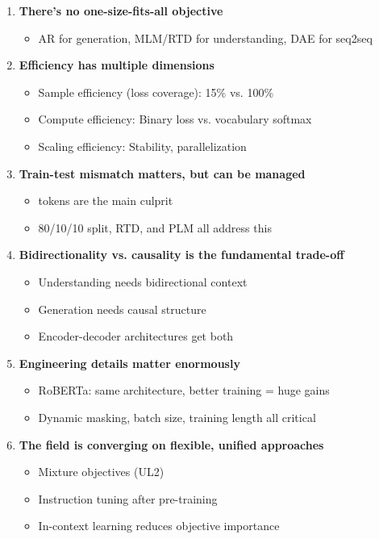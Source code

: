 \documentclass{article}
\begin{document}
\begin{tcolorbox}[colback=green!5!white, colframe=green!50!black, title=Core Principles of SSL Objectives]
\begin{enumerate}
\item \textbf{There's no one-size-fits-all objective}
\begin{itemize}
\item AR for generation, MLM/RTD for understanding, DAE for seq2seq
\end{itemize}

\item \textbf{Efficiency has multiple dimensions}
\begin{itemize}
\item Sample efficiency (loss coverage): 15\% vs. 100\%
\item Compute efficiency: Binary loss vs. vocabulary softmax
\item Scaling efficiency: Stability, parallelization
\end{itemize}

\item \textbf{Train-test mismatch matters, but can be managed}
\begin{itemize}
\item [MASK] tokens are the main culprit
\item 80/10/10 split, RTD, and PLM all address this
\end{itemize}

\item \textbf{Bidirectionality vs. causality is the fundamental trade-off}
\begin{itemize}
\item Understanding needs bidirectional context
\item Generation needs causal structure
\item Encoder-decoder architectures get both
\end{itemize}

\item \textbf{Engineering details matter enormously}
\begin{itemize}
\item RoBERTa: same architecture, better training = huge gains
\item Dynamic masking, batch size, training length all critical
\end{itemize}

\item \textbf{The field is converging on flexible, unified approaches}
\begin{itemize}
\item Mixture objectives (UL2)
\item Instruction tuning after pre-training
\item In-context learning reduces objective importance
\end{itemize}


\end{enumerate}
\end{tcolorbox}
\end{document}
